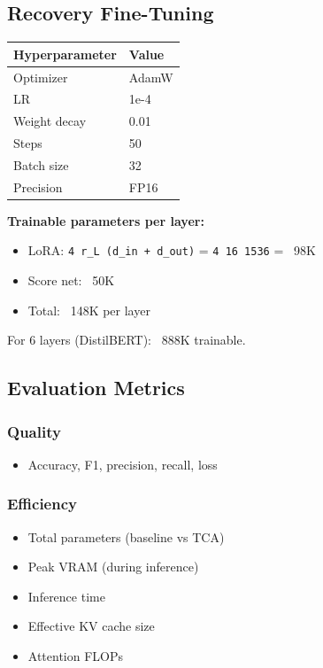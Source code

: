 \subsection{Recovery Fine-Tuning}

\begin{table}[H]
\centering
\small
\begin{tabular}{ll}
\toprule
\textbf{Hyperparameter} & \textbf{Value} \\
\midrule
Optimizer & AdamW \\
LR & 1e-4 \\
Weight decay & 0.01 \\
Steps & 50 \\
Batch size & 32 \\
Precision & FP16 \\
\bottomrule
\end{tabular}
\end{table}

\textbf{Trainable parameters per layer:}
\begin{itemize}
\item LoRA: \texttt{4   r\_L (d\_in + d\_out)} = \texttt{4   16   1536} = ~98K
\item Score net: ~50K
\item Total: ~148K per layer

\end{itemize}
For 6 layers (DistilBERT): ~888K trainable.

\subsection{Evaluation Metrics}

\subsubsection{Quality}
\begin{itemize}
\item Accuracy, F1, precision, recall, loss

\end{itemize}
\subsubsection{Efficiency}
\begin{itemize}
\item Total parameters (baseline vs TCA)
\item Peak VRAM (during inference)
\item Inference time
\item Effective KV cache size
\item Attention FLOPs

\end{itemize}
